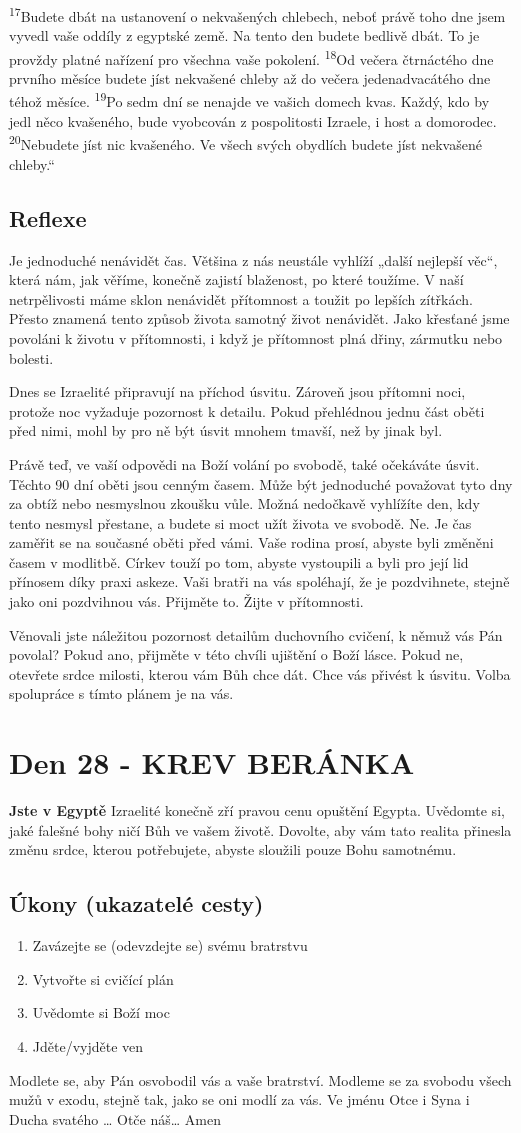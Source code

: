 \documentclass[11pt]{article}
\newcommand{\zacatekCtvrtyTyden}{
  \textbf{Jste v Egyptě} \newline
  Izraelité konečně zří pravou cenu opuštění Egypta. Uvědomte si, jaké falešné bohy ničí Bůh ve vašem životě.
Dovolte, aby vám tato realita přinesla změnu srdce, kterou potřebujete, abyste sloužili pouze Bohu samotnému.

\subsection*{Úkony (ukazatelé cesty)}
\begin{enumerate}
  \item Zavázejte se (odevzdejte se) svému bratrstvu
  \item Vytvořte si cvičící plán
  \item Uvědomte si Boží moc
  \item Jděte/vyjděte ven
\end{enumerate}
Modlete se, aby Pán osvobodil vás a vaše bratrství. \newline
Modleme se za svobodu všech mužů v exodu, stejně tak, jako se oni modlí za vás.\newline
Ve jménu Otce i Syna i Ducha svatého …  Otče náš… Amen
}
\begin{document}
{\textsuperscript{17}Budete dbát na ustanovení o nekvašených chlebech, neboť právě toho dne jsem vyvedl vaše oddíly z egyptské země. Na tento den budete bedlivě dbát. To je provždy platné nařízení pro všechna vaše pokolení.
\textsuperscript{18}Od večera čtrnáctého dne prvního měsíce budete jíst nekvašené chleby až do večera jedenadvacátého dne téhož měsíce.
\textsuperscript{19}Po sedm dní se nenajde ve vašich domech kvas. Každý, kdo by jedl něco kvašeného, bude vyobcován z pospolitosti Izraele, i host a domorodec.
\textsuperscript{20}Nebudete jíst nic kvašeného. Ve všech svých obydlích budete jíst nekvašené chleby.“
}

\subsection*{Reflexe}
Je jednoduché nenávidět čas. Většina z nás neustále vyhlíží „další nejlepší věc“, která nám, jak věříme, konečně zajistí
blaženost, po které toužíme. V naší netrpělivosti máme sklon nenávidět přítomnost a toužit po lepších zítřkách. Přesto znamená
tento způsob života samotný život nenávidět. Jako křesťané jsme povoláni k životu v přítomnosti, i když je přítomnost plná
dřiny, zármutku nebo bolesti.

Dnes se Izraelité připravují na příchod úsvitu. Zároveň jsou přítomni noci, protože noc vyžaduje pozornost k detailu. Pokud
přehlédnou jednu část oběti před nimi, mohl by pro ně být úsvit mnohem tmavší, než by jinak byl.

Právě teď, ve vaší odpovědi na Boží volání po svobodě, také očekáváte úsvit. Těchto 90 dní oběti jsou cenným časem. Může
být jednoduché považovat tyto dny za obtíž nebo nesmyslnou zkoušku vůle. Možná nedočkavě vyhlížíte den, kdy tento
nesmysl přestane, a budete si moct užít života ve svobodě. Ne. Je čas zaměřit se na současné oběti před vámi. Vaše rodina
prosí, abyste byli změněni časem v modlitbě. Církev touží po tom, abyste vystoupili a byli pro její lid přínosem díky praxi
askeze. Vaši bratři na vás spoléhají, že je pozdvihnete, stejně jako oni pozdvihnou vás. Přijměte to. Žijte v přítomnosti.

Věnovali jste náležitou pozornost detailům duchovního cvičení, k němuž vás Pán povolal? Pokud ano, přijměte v této chvíli
ujištění o Boží lásce. Pokud ne, otevřete srdce milosti, kterou vám Bůh chce dát. Chce vás přivést k úsvitu. Volba spolupráce
s tímto plánem je na vás.

\newpage
\section{Den 28 - KREV BERÁNKA}
\zacatekCtvrtyTyden
\end{document}
